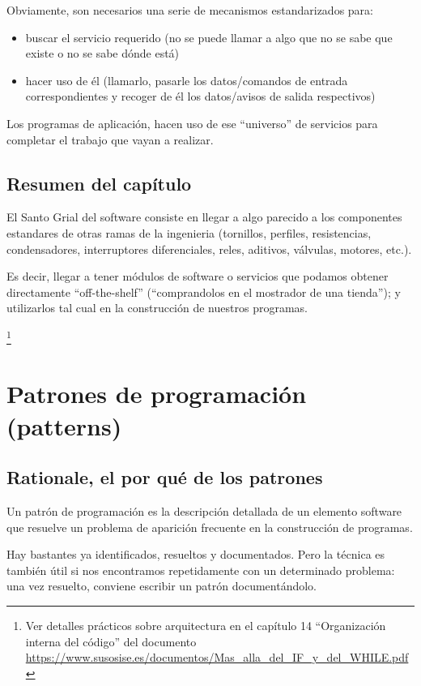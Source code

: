 \documentclass[spanish,12pt,a4paper,final,oneside]{book}
\begin{document}
Obviamente, son necesarios una serie de mecanismos estandarizados para:
\begin{itemize}
\item buscar el servicio requerido (no se puede llamar a algo que no se sabe que existe o no se sabe dónde está) 
\item hacer uso de él (llamarlo, pasarle los datos/comandos de entrada correspondientes y recoger de él los datos/avisos de salida respectivos)
\end{itemize}

Los programas de aplicación, hacen uso de ese ``universo'' de servicios para completar el trabajo que vayan a realizar.

\section*{Resumen del capítulo}
El Santo Grial del software consiste en llegar a algo parecido a los componentes estandares de otras ramas de la ingenieria (tornillos, perfiles, resistencias, condensadores, interruptores diferenciales, reles, aditivos, válvulas, motores, etc.). 

Es decir, llegar a tener módulos de software o servicios que podamos obtener directamente ``off-the-shelf'' (``comprandolos en el mostrador de una tienda''); y utilizarlos tal cual en la construcción de nuestros programas.


\vspace{3cm}
\footnote{Ver detalles prácticos sobre arquitectura en el capítulo 14 ``Organización interna del código'' del documento \url{https://www.susosise.es/documentos/Mas_alla_del_IF_y_del_WHILE.pdf}}




\chapter{Patrones de programación (patterns)}
\section{Rationale, el por qué de los patrones}
Un patrón de programación es la descripción detallada de un elemento software que resuelve un problema de  aparición frecuente en la construcción de programas. 

Hay bastantes ya identificados, resueltos y documentados. Pero la técnica es también útil si nos encontramos repetidamente con un determinado problema: una vez resuelto, conviene escribir un patrón documentándolo.
\end{document}
